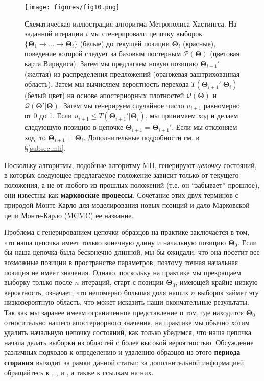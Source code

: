 \documentclass[12pt, titlepage]{article}
\newcommand{\params}{\ensuremath{\boldsymbol\Theta}}
\newcommand{\posterior}{\ensuremath{\mathcal{P}}}
\newcommand{\proposal}{\ensuremath{\mathcal{Q}}}
\begin{document}
\begin{figure}
\begin{center}
\texttt{[image: figures/fig10.png]}
\end{center}
\caption{Схематическая иллюстрация алгоритма Метрополиса-Хастингса. На заданной итерации $i$ мы сгенерировали цепочку выборок $\{ \params_1 \rightarrow \dots \rightarrow \params_i \}$ (белые) до текущей позиции $\params_i$ (красные), поведение которой следует за базовым постерным $\posterior(\params)$ (цветовая карта Виридиса). Затем мы предлагаем новую позицию $\params_{i+1}'$ (желтая) из распределения предложений (оранжевая заштрихованная область). Затем мы вычисляем вероятность перехода $T(\params_{i+1}'|\params_i)$ (белый цвет) на основе апостериорных плотностей $\proposal(\params)$ и $\proposal(\params'|\params)$. Затем мы генерируем случайное число $u_{i+1}$ равномерно от 0 до 1. Если $u_{i+1} \leq T(\params_{i+1}'|\params_i)$, мы принимаем ход и делаем следующую позицию в цепочке $\params_{i+1} = \params_{i+1}'$. Если мы отклоняем ход, то $\params_{i+1} = \params_{i}$. Дополнительные подробности см. в \S\ref{subsec:mh}. }\label{fig:mh} \end{figure}

Поскольку алгоритмы, подобные алгоритму MH, генерируют \textit{цепочку} состояний, в которых следующее предлагаемое положение зависит только от текущего положения, а не от любого из прошлых положений (т.е. он ``забывает'' прошлое), они известны как \textbf{марковские процессы}. Сочетание этих двух терминов с природой Монте-Карло для моделирования новых позиций и дало Марковской цепи Монте-Карло (MCMC) ее название.

Проблема с генерированием цепочки образцов на практике заключается в том, что наша цепочка имеет только конечную длину и начальную позицию $\params_0$. Если бы наша цепочка была бесконечно длинной, мы бы ожидали, что она посетит все возможные позиции в пространстве параметров, поэтому точная начальная позиция не имеет значения. Однако, поскольку на практике мы прекращаем выборку только после $n$ итераций, старт с позиции $\params_0$, имеющей крайне низкую вероятность, означает, что непомерно большая доля наших $n$ выборок займет эту низковероятную область, что может исказить наши окончательные результаты. Так как мы заранее имеем ограниченное представление о том, где находится $\params_0$ относительно нашего апостериорного значения, на практике мы обычно хотим удалить начальную цепочку состояний, как только убедимся, что наша цепочка начала делать выборки из областей с более высокой вероятностью. Обсуждение различных подходов к определению и удалению образцов из этого \textbf{периода сгорания} выходит за рамки данной статьи; за дополнительной информацией обращайтесь к \citet{gelmanrubin92}, \citet{gelman+13}, и \citet{vehtari+19}, а также к ссылкам на них.
\end{document}

